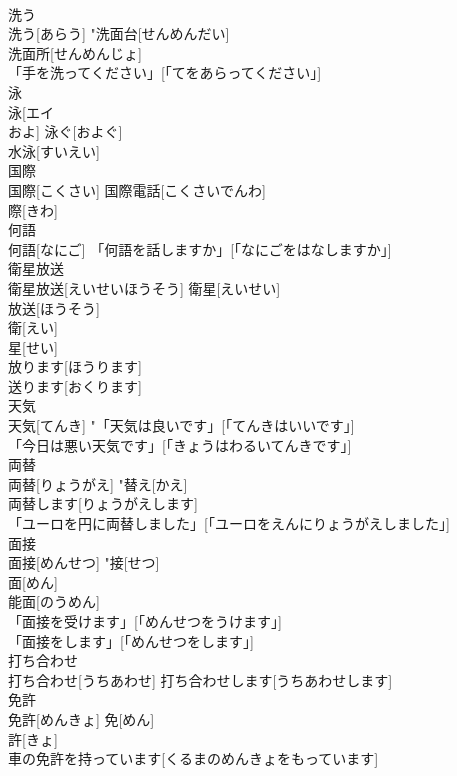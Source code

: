 \documentclass[8pt]{extreport}
\begin{document}
\begin{CJK}{UTF8}{min}
\\	洗う	
\\	洗う[あらう]	"洗面台[せんめんだい] 
\\	洗面所[せんめんじょ] 
\\	「手を洗ってください」[「てをあらってください」] 
\\	泳	
\\	泳[エイ 
\\	およ]	泳ぐ[およぐ] 
\\	水泳[すいえい] 
\\	国際	
\\	国際[こくさい]	国際電話[こくさいでんわ] 
\\	際[きわ] 
\\	何語	
\\	何語[なにご]	「何語を話しますか」[「なにごをはなしますか」] 
\\	衛星放送	
\\	衛星放送[えいせいほうそう]	衛星[えいせい] 
\\	放送[ほうそう] 
\\	衛[えい] 
\\	星[せい] 
\\	放ります[ほうります] 
\\	送ります[おくります] 
\\	天気	
\\	天気[てんき]	"「天気は良いです」[「てんきはいいです」] 
\\	「今日は悪い天気です」[「きょうはわるいてんきです」] 
\\	両替	
\\	両替[りょうがえ]	"替え[かえ] 
\\	両替します[りょうがえします] 
\\	「ユーロを円に両替しました」[「ユーロをえんにりょうがえしました」] 
\\	面接	
\\	面接[めんせつ]	"接[せつ] 
\\	面[めん] 
\\	能面[のうめん] 
\\	「面接を受けます」[「めんせつをうけます」] 
\\	「面接をします」[「めんせつをします」] 
\\	打ち合わせ	
\\	打ち合わせ[うちあわせ]	打ち合わせします[うちあわせします] 
\\	免許	
\\	免許[めんきょ]	免[めん] 
\\	許[きょ] 
\\	車の免許を持っています[くるまのめんきょをもっています] 

\end{CJK}
\end{document}
